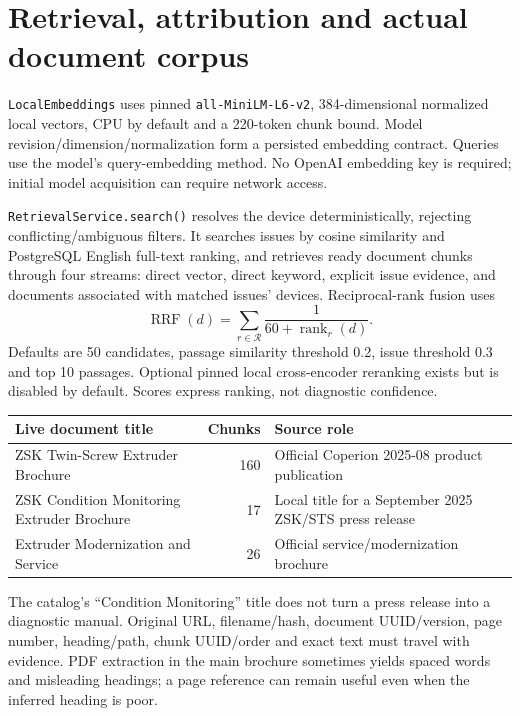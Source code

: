 \section{Retrieval, attribution and actual document corpus}
\texttt{LocalEmbeddings} uses pinned \texttt{all-MiniLM-L6-v2}, 384-dimensional normalized local vectors, CPU by default and a 220-token chunk bound. Model revision/dimension/normalization form a persisted embedding contract. Queries use the model's query-embedding method. No OpenAI embedding key is required; initial model acquisition can require network access.

\texttt{RetrievalService.search()} resolves the device deterministically, rejecting conflicting/ambiguous filters. It searches issues by cosine similarity and PostgreSQL English full-text ranking, and retrieves ready document chunks through four streams: direct vector, direct keyword, explicit issue evidence, and documents associated with matched issues' devices. Reciprocal-rank fusion uses
\[\operatorname{RRF}(d)=\sum_{r\in\mathcal{R}}\frac{1}{60+\operatorname{rank}_{r}(d)}.\]
Defaults are 50 candidates, passage similarity threshold 0.2, issue threshold 0.3 and top 10 passages. Optional pinned local cross-encoder reranking exists but is disabled by default. Scores express ranking, not diagnostic confidence.
\par\smallskip\noindent\begin{tabularx}{\linewidth}{@{}p{.47\linewidth}rX@{}}\toprule
Live document title & Chunks & Source role\\\midrule
ZSK Twin-Screw Extruder Brochure & 160 & Official Coperion 2025-08 product publication\\
ZSK Condition Monitoring Extruder Brochure & 17 & Local title for a September 2025 ZSK/STS press release\\
Extruder Modernization and Service & 26 & Official service/modernization brochure\\\bottomrule
\end{tabularx}\par\smallskip
The catalog's ``Condition Monitoring'' title does not turn a press release into a diagnostic manual. Original URL, filename/hash, document UUID/version, page number, heading/path, chunk UUID/order and exact text must travel with evidence. PDF extraction in the main brochure sometimes yields spaced words and misleading headings; a page reference can remain useful even when the inferred heading is poor.
